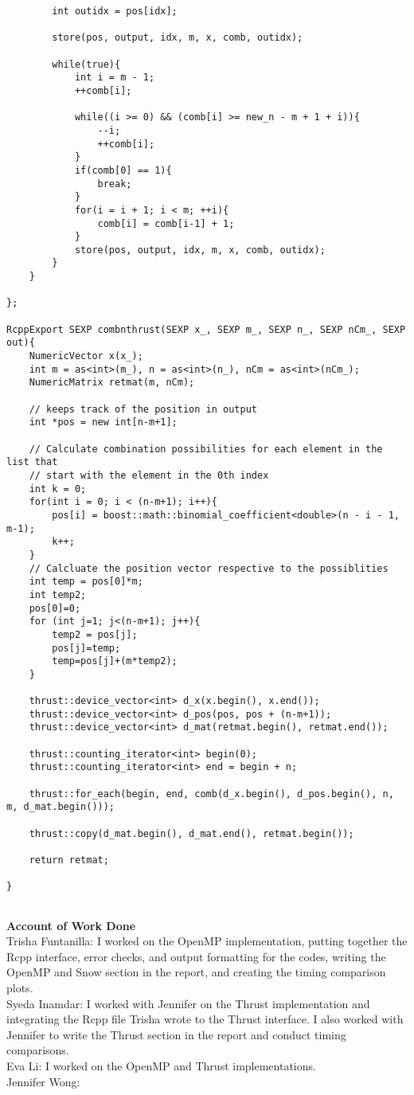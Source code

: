 {\begin{lstlisting}
        int outidx = pos[idx];
        
		store(pos, output, idx, m, x, comb, outidx);

		while(true){
			int i = m - 1;
			++comb[i];
	
			while((i >= 0) && (comb[i] >= new_n - m + 1 + i)){
				--i;
				++comb[i];
			}
			if(comb[0] == 1){
				break;
			}
			for(i = i + 1; i < m; ++i){
				comb[i] = comb[i-1] + 1;
			}
            store(pos, output, idx, m, x, comb, outidx);
		}
	}

};

RcppExport SEXP combnthrust(SEXP x_, SEXP m_, SEXP n_, SEXP nCm_, SEXP out){
	NumericVector x(x_);
	int m = as<int>(m_), n = as<int>(n_), nCm = as<int>(nCm_);
	NumericMatrix retmat(m, nCm);

    // keeps track of the position in output
    int *pos = new int[n-m+1];
    
    // Calculate combination possibilities for each element in the list that
    // start with the element in the 0th index
    int k = 0;
    for(int i = 0; i < (n-m+1); i++){
        pos[i] = boost::math::binomial_coefficient<double>(n - i - 1, m-1);
        k++;
    }
    // Calcluate the position vector respective to the possiblities
    int temp = pos[0]*m;
    int temp2;
    pos[0]=0;
    for (int j=1; j<(n-m+1); j++){
        temp2 = pos[j];
        pos[j]=temp;
        temp=pos[j]+(m*temp2);
    }
	
	thrust::device_vector<int> d_x(x.begin(), x.end());
    thrust::device_vector<int> d_pos(pos, pos + (n-m+1));
	thrust::device_vector<int> d_mat(retmat.begin(), retmat.end());
    
	thrust::counting_iterator<int> begin(0);
	thrust::counting_iterator<int> end = begin + n;

	thrust::for_each(begin, end, comb(d_x.begin(), d_pos.begin(), n, m, d_mat.begin()));

	thrust::copy(d_mat.begin(), d_mat.end(), retmat.begin());
	
	return retmat;
    
}


\end{lstlisting}
}

\newpage
\textbf{\Large{Account of Work Done}}\\
\null
Trisha Funtanilla: I worked on the OpenMP implementation, putting together the Rcpp interface, error checks, and output formatting for the codes, writing the OpenMP and Snow section in the report, and creating the timing comparison plots.
\\
\null
Syeda Inamdar: I worked with Jennifer on the Thrust implementation and integrating the Rcpp file Trisha wrote to the Thrust interface. I also worked with Jennifer to write the Thrust section in the report and conduct timing comparisons.
\\
\null
Eva Li: I worked on the OpenMP and Thrust implementations.
\\
\null
Jennifer Wong:



